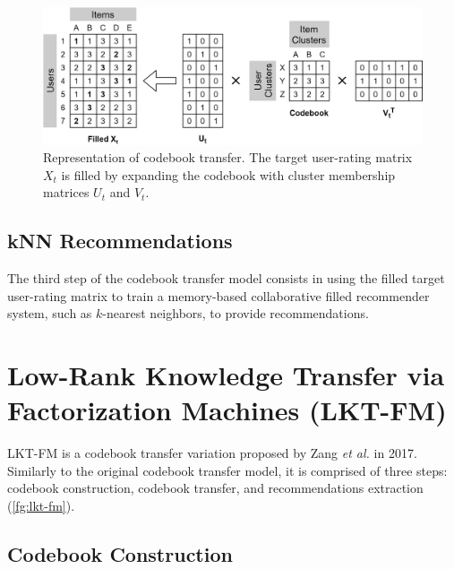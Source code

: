 \begin{figure}[hbt]
\centering
\includegraphics[width=\textwidth]{pictures/codebook-transfer}
\caption{Representation of codebook transfer. The target user-rating matrix $X_t$ is filled by expanding the codebook with cluster membership matrices $U_t$ and $V_t$.}
\label{fg:codebook-transfer}
\end{figure}


\subsection{kNN Recommendations}

The third step of the codebook transfer model consists in using the filled target user-rating matrix to train a memory-based collaborative filled recommender system, such as $k$-nearest neighbors, to provide recommendations.


\section{Low-Rank Knowledge Transfer via Factorization Machines (LKT-FM)}

LKT-FM is a codebook transfer variation proposed by Zang \textit{et al.} \cite{10.1007/978-3-319-71246-8_39} in 2017.\\
Similarly to the original codebook transfer model, it is comprised of three steps: codebook construction, codebook transfer, and recommendations extraction (\autoref{fg:lkt-fm}).


\subsection{Codebook Construction}


